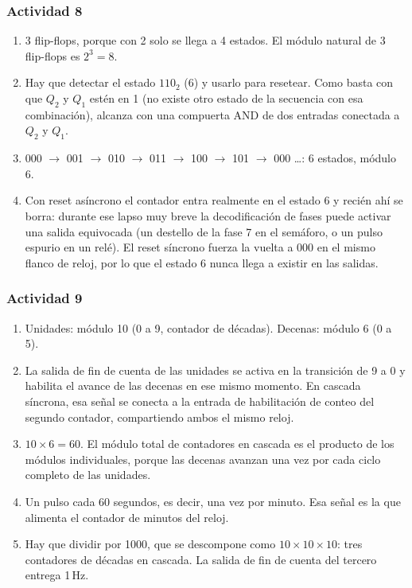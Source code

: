 \subsubsection*{Actividad 8}

\begin{enumerate}[label=\textbf{\alph*)}]
    \item 3 flip-flops, porque con 2 solo se llega a 4 estados. El módulo natural de 3 flip-flops es $2^3 = 8$.
    \item Hay que detectar el estado $110_2$ (6) y usarlo para resetear. Como basta con que $Q_2$ y $Q_1$ estén en 1 (no existe otro estado de la secuencia con esa combinación), alcanza con una compuerta AND de dos entradas conectada a $Q_2$ y $Q_1$.
    \item 000 $\rightarrow$ 001 $\rightarrow$ 010 $\rightarrow$ 011 $\rightarrow$ 100 $\rightarrow$ 101 $\rightarrow$ 000 \ldots: 6 estados, módulo 6.
    \item Con reset asíncrono el contador entra realmente en el estado 6 y recién ahí se borra: durante ese lapso muy breve la decodificación de fases puede activar una salida equivocada (un destello de la fase 7 en el semáforo, o un pulso espurio en un relé). El reset síncrono fuerza la vuelta a 000 en el mismo flanco de reloj, por lo que el estado 6 nunca llega a existir en las salidas.
\end{enumerate}

\subsubsection*{Actividad 9}

\begin{enumerate}[label=\textbf{\alph*)}]
    \item Unidades: módulo 10 (0 a 9, contador de décadas). Decenas: módulo 6 (0 a 5).
    \item La salida de fin de cuenta de las unidades se activa en la transición de 9 a 0 y habilita el avance de las decenas en ese mismo momento. En cascada síncrona, esa señal se conecta a la entrada de habilitación de conteo del segundo contador, compartiendo ambos el mismo reloj.
    \item $10 \times 6 = 60$. El módulo total de contadores en cascada es el producto de los módulos individuales, porque las decenas avanzan una vez por cada ciclo completo de las unidades.
    \item Un pulso cada 60 segundos, es decir, una vez por minuto. Esa señal es la que alimenta el contador de minutos del reloj.
    \item Hay que dividir por 1000, que se descompone como $10 \times 10 \times 10$: tres contadores de décadas en cascada. La salida de fin de cuenta del tercero entrega 1\,Hz.
\end{enumerate}

